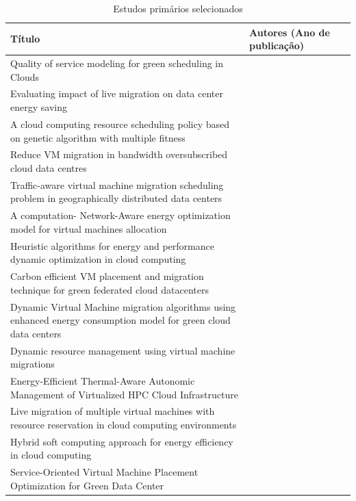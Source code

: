 \documentclass[
	12pt,				%
	oneside,			%
	a4paper,			%
	english,			%
	brazil				%
	]{abntex2ppgsi}
\begin{document}
\begin{apendicesenv}
\begin{longtable}{|p{3in}|p{2in}|p{1in}|}
	\caption{Estudos primários selecionados}
	\label{tab:EstudosPrimariosSelecionados} \\
	\hline
	\textbf{Título} & \textbf{Autores (Ano de publicação)} \\
	\hline
	Quality of service modeling for green scheduling in Clouds & \citeonline{Guérout2014225} \\
	\hline 
	Evaluating impact of live migration on data center energy saving & \citeonline{Akiyama2015759} \\
	\hline 
	A cloud computing resource scheduling policy based on genetic algorithm with multiple fitness & \citeonline{Chen2012177} \\
	\hline 
	Reduce VM migration in bandwidth oversubscribed cloud data centres & \citeonline{Shahzad2015140} \\
	\hline 
	Traffic-aware virtual machine migration scheduling problem in geographically distributed data centers & \citeonline{Teyeb2016798} \\
	\hline
	A computation- Network-Aware energy optimization model for virtual machines allocation & \citeonline{Canali201743} \\
	\hline
	Heuristic algorithms for energy and performance dynamic optimization in cloud computing & \citeonline{Guo20171335} \\
	\hline
	Carbon efficient VM placement and migration technique for green federated cloud datacenters & \citeonline{Wadhwa20142297} \\
	\hline
	Dynamic Virtual Machine migration algorithms using enhanced energy consumption model for green cloud data centers & \citeonline{Huang2014902} \\
	\hline
	Dynamic resource management using virtual machine migrations & \citeonline{Mishra201234} \\
	\hline
	Energy-Efficient Thermal-Aware Autonomic Management of Virtualized HPC Cloud Infrastructure & \citeonline{Rodero2012447} \\
	\hline
	Live migration of multiple virtual machines with resource reservation in cloud computing environments & \citeonline{Ye2011267} \\
	\hline
	Hybrid soft computing approach for energy efficiency in cloud computing & \citeonline{Jasuja2016} \\
	\hline
	Service-Oriented Virtual Machine Placement Optimization for Green Data Center & \citeonline{Tseng2015556} \\

\end{longtable}
\end{apendicesenv}
\end{document}
